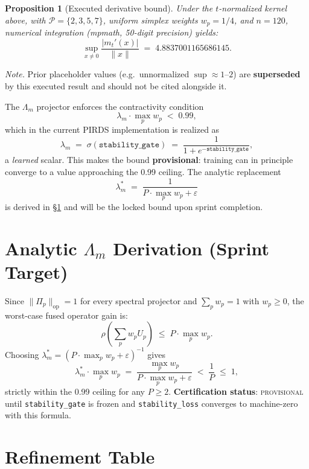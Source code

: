 \documentclass[11pt]{article}
\newtheorem{proposition}[theorem]{Proposition}
\begin{document}
\begin{proposition}[Executed derivative bound]
Under the $t$-normalized kernel above, with
$\mathcal{P} = \{2, 3, 5, 7\}$, uniform simplex weights
$w_p = 1/4$, and $n = 120$, numerical integration (mpmath,
50-digit precision) yields:
\[
    \sup_{x \neq 0} \frac{|m_t'(x)|}{\|x\|}
    \;=\; 4.8837001165686145.
\]
\end{proposition}

\noindent\textit{Note.}
Prior placeholder values (e.g.\ unnormalized $\sup \approx 1$--$2$)
are \textbf{superseded} by this executed result and should not
be cited alongside it.

The $\Lambda_m$ projector enforces the contractivity condition
\[
    \lambda_m \cdot \max_{p} w_p \;<\; 0.99,
\]
which in the current PIRDS implementation is realized as
\[
    \lambda_m \;=\; \sigma(\texttt{stability\_gate})
    \;=\; \frac{1}{1 + e^{-\texttt{stability\_gate}}},
\]
a \emph{learned} scalar.
This makes the bound \textbf{provisional}: training can in principle
converge to a value approaching the 0.99 ceiling.
The analytic replacement
\[
    \lambda_m^* \;=\; \frac{1}{P \cdot \max_p w_p + \varepsilon}
\]
is derived in \S\ref{sec:analytic} and will be the locked bound
upon sprint completion.

\section{Analytic $\Lambda_m$ Derivation (Sprint Target)}
\label{sec:analytic}

Since $\|\Pi_p\|_{\mathrm{op}} = 1$ for every spectral projector
and $\sum_p w_p = 1$ with $w_p \geq 0$, the worst-case fused operator
gain is:
\[
    \rho\!\left(\sum_p w_p U_p\right)
    \;\leq\;
    P \cdot \max_p w_p.
\]
Choosing $\lambda_m^* = (P \cdot \max_p w_p + \varepsilon)^{-1}$ gives
\[
    \lambda_m^* \cdot \max_p w_p
    \;=\;
    \frac{\max_p w_p}{P \cdot \max_p w_p + \varepsilon}
    \;<\; \frac{1}{P} \;\leq\; 1,
\]
strictly within the 0.99 ceiling for any $P \geq 2$.
\textbf{Certification status}: \textsc{provisional} until
\texttt{stability\_gate} is frozen and \texttt{stability\_loss}
converges to machine-zero with this formula.

\section{Refinement Table}
\label{sec:refine}
\end{document}
